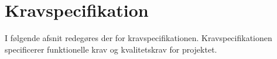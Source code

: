 \chapter{Kravspecifikation}
I følgende afsnit redegøres der for kravspecifikationen. Kravspecifikationen specificerer funktionelle krav og kvalitetskrav for projektet.


